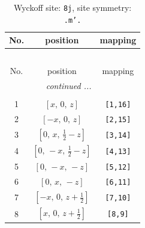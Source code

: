 \documentclass[fleqn,8pt]{jsarticle}
\begin{document}
\begin{longtable}{ccc}
\caption{Wyckoff site: {\tt 8j}, site symmetry: {\tt .m'.}}
 \\
 \hline \hline
No. & position & mapping \\ \hline \endfirsthead

\multicolumn{2}{l}{\tablename\ \thetable{}} \\
 \hline \hline
No. & position & mapping \\ \hline \endhead

 \hline \hline
\multicolumn{2}{r}{\footnotesize\it continued ...} \\ \endfoot

 \hline \hline
\multicolumn{2}{r}{} \\ \endlastfoot

1 & $\left[ x,\, 0,\, z \right]$ & {\tt [1,16]} \\ \hline
2 & $\left[ - x,\, 0,\, z \right]$ & {\tt [2,15]} \\ \hline
3 & $\left[ 0,\, x,\, \frac{1}{2} - z \right]$ & {\tt [3,14]} \\ \hline
4 & $\left[ 0,\, - x,\, \frac{1}{2} - z \right]$ & {\tt [4,13]} \\ \hline
5 & $\left[ 0,\, - x,\, - z \right]$ & {\tt [5,12]} \\ \hline
6 & $\left[ 0,\, x,\, - z \right]$ & {\tt [6,11]} \\ \hline
7 & $\left[ - x,\, 0,\, z + \frac{1}{2} \right]$ & {\tt [7,10]} \\ \hline
8 & $\left[ x,\, 0,\, z + \frac{1}{2} \right]$ & {\tt [8,9]} \\
\end{longtable}
\renewcommand{\arraystretch}{1.2}
\end{document}
